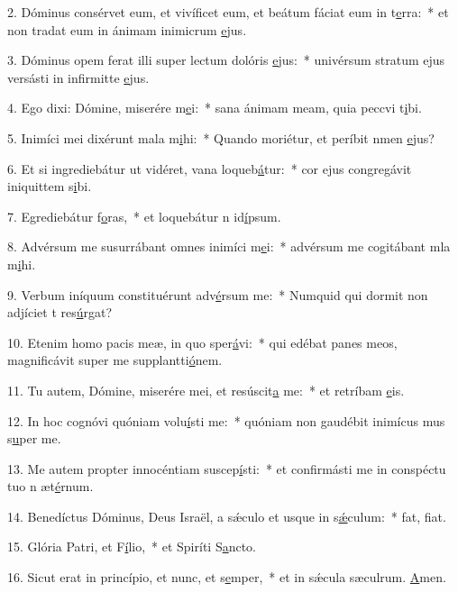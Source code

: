 2. Dóminus consérvet eum, et vivíficet eum, et beátum fáciat eum in t\uline{e}rra:~* et non tradat eum in ánimam inimicrum \uline{e}jus.\par 
3. Dóminus opem ferat illi super lectum dolóris \uline{e}jus:~* univérsum stratum ejus versásti in infirmitte \uline{e}jus.\par 
4. Ego dixi: Dómine, miserére m\uline{e}i:~* sana ánimam meam, quia peccvi t\uline{i}bi.\par 
5. Inimíci mei dixérunt mala m\uline{i}hi:~* Quando moriétur, et períbit nmen \uline{e}jus?\par 
6. Et si ingrediebátur ut vidéret, vana loqueb\uline{á}tur:~* cor ejus congregávit iniquittem s\uline{i}bi.\par 
7. Egrediebátur f\uline{o}ras,~* et loquebátur n id\uline{í}psum.\par 
8. Advérsum me susurrábant omnes inimíci m\uline{e}i:~* advérsum me cogitábant mla m\uline{i}hi.\par 
9. Verbum iníquum constituérunt adv\uline{é}rsum me:~* Numquid qui dormit non adjíciet t res\uline{ú}rgat?\par 
10. Etenim homo pacis meæ, in quo sper\uline{á}vi:~* qui edébat panes meos, magnificávit super me supplantti\uline{ó}nem.\par 
11. Tu autem, Dómine, miserére mei, et resúscit\uline{a} me:~* et retríbam \uline{e}is.\par 
12. In hoc cognóvi quóniam volu\uline{í}sti me:~* quóniam non gaudébit inimícus mus s\uline{u}per me.\par 
13. Me autem propter innocéntiam suscep\uline{í}sti:~* et confirmásti me in conspéctu tuo n æt\uline{é}rnum.\par 
14. Benedíctus Dóminus, Deus Israël, a sǽculo et usque in s\uline{ǽ}culum:~* fat, f\uline{i}at.\par 
15. Glória Patri, et F\uline{í}lio,~* et Spiríti S\uline{a}ncto.\par 
16. Sicut erat in princípio, et nunc, et s\uline{e}mper,~* et in sǽcula sæculrum. \uline{A}men.\par 
